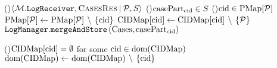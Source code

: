 \UponEv(){\upshape $\langle \mathcal{M}.\texttt{LogReceiver}, \textrm{\textsc{CasesRes}} \:|\: \mathcal{P}, S \rangle$ \SuchThat{$\LPrv \in \LPrvS$} \label{alg:CasesRes} }{
	\ForEach(){\upshape $\textrm{casePart}_{\textrm{cid}} \in S$}{%
		\If(){\upshape $\textrm{cid} \in \textrm{PMap}[\mathcal{P}]$}  {%
			$\textrm{PMap}[\mathcal{P}] \gets \textrm{PMap}[\mathcal{P}] \,\setminus\, \{\textrm{cid}\}$ \;
			$\textrm{CIDMap}[\textrm{cid}] \gets \textrm{CIDMap}[\textrm{cid}] \,\setminus\, \{\mathcal{P}\}$ \;
			$\texttt{LogManager}.\texttt{mergeAndStore}\left(\textrm{Cases}, \textrm{casePart}_{\textrm{cid}}\right)$ 
		}
	}
}

\Upon(){\upshape $\textrm{CIDMap}[\textrm{cid}]= \emptyset$ for some $\textrm{cid} \in \textrm{dom}(\textrm{CIDMap})$} {%
	$\textrm{dom}(\textrm{CIDMap}) \gets \textrm{dom}(\textrm{CIDMap}) \,\setminus\, \{\textrm{cid}\}$\;
	\Yield{\upshape \CStor[\CId] \To{}}  
}

\endinput
UPON EVENT(M,CASERES|P,S) SUCH THAT P in \widehat{\mathcal{P}} DO
	for each C ∈ S:
		if C.cid ∈ PMap[P]
			CMap[C.cid]<--CMap[C.cid] ∪ {C}
			PMap[P]<-- PMap[P] \ {C.cid}
			CIDMap[C.cid]<-- CIDMap[C.cid] \ {P}


UPON |CIDMap[cid]|=0 such that cid in dom(CIDMap) //Computation phase start here.
merge all traces in CIDMap[cid] using mergingSchema and put it in mergedTrace
yeld PMAlgorithm(mergedTrace)
